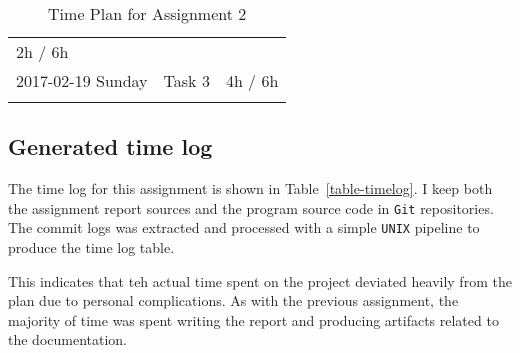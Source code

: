 \begin{longtable}[c]{@{}lll@{}}
\begin{minipage}[t]{0.32\columnwidth}
2h / 6h
\strut\end{minipage}\tabularnewline
\begin{minipage}[t]{0.28\columnwidth}\raggedright\strut
2017-02-19 Sunday
\strut\end{minipage} &
\begin{minipage}[t]{0.25\columnwidth}\raggedright\strut
Task 3
\strut\end{minipage} &
\begin{minipage}[t]{0.32\columnwidth}\raggedright\strut
4h / 6h
\strut\end{minipage}\tabularnewline
\bottomrule
  \caption{Time Plan for Assignment 2}
  \label{table-timeplan}
\end{longtable}




\subsection{Generated time log}\label{time-log-result}

The time log for this assignment is shown in Table~\ref{table-timelog}.  I keep
both the assignment report \latex sources and the program source code in
\texttt{Git} repositories. The commit logs was extracted and processed with a
simple \texttt{UNIX} pipeline to produce the time log table.

This indicates that teh actual time spent on the project deviated heavily from
the plan due to personal complications.
As with the previous assignment, the majority of time was spent writing the
report and producing artifacts related to the documentation.


